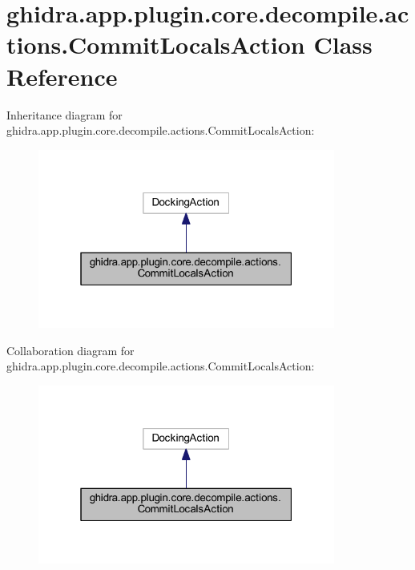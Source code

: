 \hypertarget{classghidra_1_1app_1_1plugin_1_1core_1_1decompile_1_1actions_1_1_commit_locals_action}{}\section{ghidra.\+app.\+plugin.\+core.\+decompile.\+actions.\+Commit\+Locals\+Action Class Reference}
\label{classghidra_1_1app_1_1plugin_1_1core_1_1decompile_1_1actions_1_1_commit_locals_action}


Inheritance diagram for ghidra.\+app.\+plugin.\+core.\+decompile.\+actions.\+Commit\+Locals\+Action\+:
\nopagebreak
\begin{figure}[H]
\begin{center}
\leavevmode
\includegraphics[width=277pt]{classghidra_1_1app_1_1plugin_1_1core_1_1decompile_1_1actions_1_1_commit_locals_action__inherit__graph}
\end{center}
\end{figure}


Collaboration diagram for ghidra.\+app.\+plugin.\+core.\+decompile.\+actions.\+Commit\+Locals\+Action\+:
\nopagebreak
\begin{figure}[H]
\begin{center}
\leavevmode
\includegraphics[width=277pt]{classghidra_1_1app_1_1plugin_1_1core_1_1decompile_1_1actions_1_1_commit_locals_action__coll__graph}
\end{center}
\end{figure}
